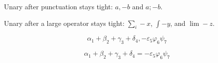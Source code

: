 Unary after punctuation stays tight: $a,-b$ and $a;-b$.

Unary after a large operator stays tight: $\sum_i-x$, $\int-y$, and $\lim-z$.

\[
  \alpha_{1} + \beta_{2} + \gamma_{3} + \delta_{4}, -\varepsilon_{5} \varphi_{6} \psi_{7}
\]

\[
  \alpha_{1} + \beta_{2} + \gamma_{3} + \delta_{4} = -\varepsilon_{5} \varphi_{6} \psi_{7}
\]
